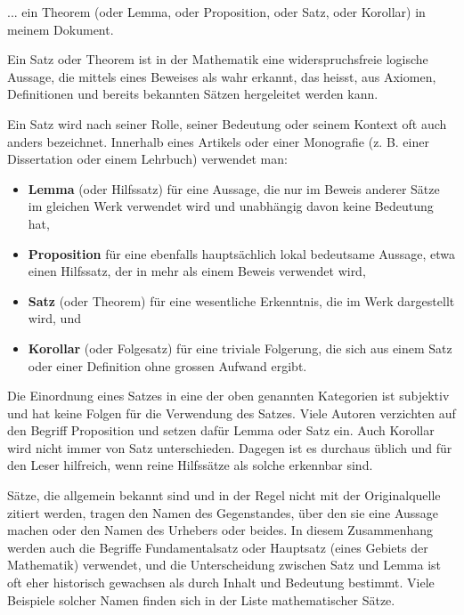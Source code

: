 
... ein Theorem (oder Lemma, oder Proposition, oder Satz, oder Korollar) in meinem Dokument.

Ein Satz oder Theorem ist in der Mathematik eine widerspruchsfreie logische Aussage, die mittels eines Beweises als wahr erkannt, das heisst, aus Axiomen, Definitionen und bereits bekannten Sätzen hergeleitet werden kann.

Ein Satz wird nach seiner Rolle, seiner Bedeutung oder seinem Kontext oft auch anders bezeichnet. Innerhalb eines Artikels oder einer Monografie (z. B. einer Dissertation oder einem Lehrbuch) verwendet man:

\begin{itemize}
\item \textbf{Lemma} (oder Hilfssatz) für eine Aussage, die nur im Beweis anderer Sätze im gleichen Werk verwendet wird und unabhängig davon keine Bedeutung hat,
\item \textbf{Proposition} für eine ebenfalls hauptsächlich lokal bedeutsame Aussage, etwa einen Hilfssatz, der in mehr als einem Beweis verwendet wird,
\item \textbf{Satz} (oder Theorem) für eine wesentliche Erkenntnis, die im Werk dargestellt wird, und
\item \textbf{Korollar} (oder Folgesatz) für eine triviale Folgerung, die sich aus einem Satz oder einer Definition ohne grossen Aufwand ergibt.
\end{itemize}

Die Einordnung eines Satzes in eine der oben genannten Kategorien ist subjektiv und hat keine Folgen für die Verwendung des Satzes. Viele Autoren verzichten auf den Begriff Proposition und setzen dafür Lemma oder Satz ein. Auch Korollar wird nicht immer von Satz unterschieden. Dagegen ist es durchaus üblich und für den Leser hilfreich, wenn reine Hilfssätze als solche erkennbar sind.

Sätze, die allgemein bekannt sind und in der Regel nicht mit der Originalquelle zitiert werden, tragen den Namen des Gegenstandes, über den sie eine Aussage machen oder den Namen des Urhebers oder beides. In diesem Zusammenhang werden auch die Begriffe Fundamentalsatz oder Hauptsatz (eines Gebiets der Mathematik) verwendet, und die Unterscheidung zwischen Satz und Lemma ist oft eher historisch gewachsen als durch Inhalt und Bedeutung bestimmt. Viele Beispiele solcher Namen finden sich in der Liste mathematischer Sätze.
